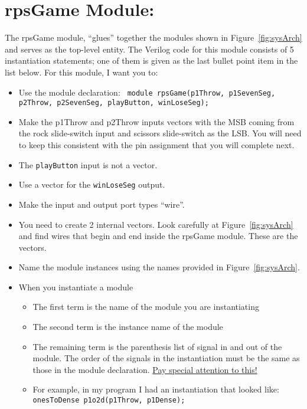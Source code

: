 \hypertarget{rpsgame-module}{%
\section{rpsGame Module:}
\label{rpsgame-module}}

The rpsGame module, ``glues'' together the modules shown in Figure~\ref{fig:sysArch} and
serves as the top-level entity. The Verilog code for this module
consists of 5 instantiation statements; one of them is given as the last
bullet point item in the list below. For this module, I want you to:

\begin{itemize}
\item
  Use the module declaration: \newline
   \verb+ module rpsGame(p1Throw, p1SevenSeg, p2Throw, p2SevenSeg, playButton, winLoseSeg);+

\item
  Make the p1Throw and p2Throw inputs vectors with the MSB coming from
  the rock slide-switch input and scissors slide-switch as the LSB. You
  will need to keep this consistent with the pin assignment that you
  will complete next.
\item
  The \verb+playButton+ input is not a vector.
\item
  Use a vector for the \verb+winLoseSeg+ output.
\item
  Make the input and output port types ``wire''.
\item
  You need to create 2 internal vectors. Look carefully at Figure~\ref{fig:sysArch} and
  find wires that begin and end inside the rpsGame module. These are the
  vectors.
\item
  Name the module instances using the names provided in Figure~\ref{fig:sysArch}.
\item
  When you instantiate a module

  \begin{itemize}
  \item
    The first term is the name of the module you are instantiating
  \item
    The second term is the instance name of the module
  \item
    The remaining term is the parenthesis list of signal in and out of
    the module. The order of the signals in the instantiation must be
    the same as those in the module declaration. \uline{Pay special
    attention to this!}
  \item
    For example, in my program I had an instantiation that looked like: \\
   \verb+onesToDense p1o2d(p1Throw, p1Dense);+
  \end{itemize}
\end{itemize}


